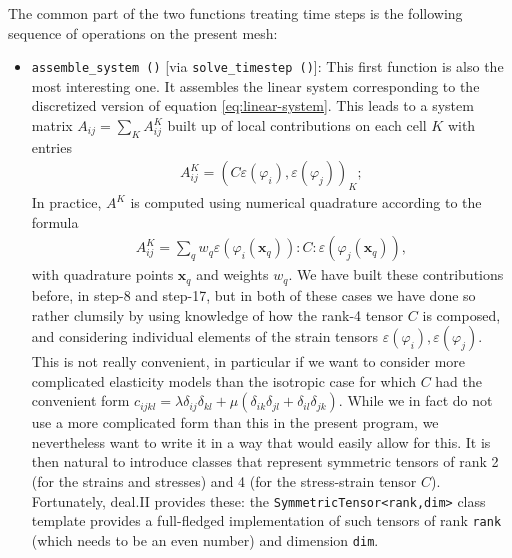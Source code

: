 \documentclass{article}
\renewcommand{\vec}[1]{\mathbf{#1}}
\begin{document}
The common part of the two functions treating time steps is the following
sequence of operations on the present mesh:
\begin{itemize}
\item \texttt{assemble\_system ()} [via \texttt{solve\_timestep ()}]:
  This first function is also the most interesting one. It assembles the
  linear system corresponding to the discretized version of equation
  \eqref{eq:linear-system}. This leads to a system matrix $A_{ij} = \sum_K
  A^K_{ij}$ built up of local contributions on each cell $K$ with entries
  \begin{gather}
    A^K_{ij} = (C \varepsilon(\varphi_i), \varepsilon(\varphi_j))_K;
  \end{gather}
  In practice, $A^K$ is computed using numerical quadrature according to the
  formula
  \begin{gather}
    A^K_{ij} = \sum_q w_q  \varepsilon(\varphi_i(\vec x_q)) : C :
                           \varepsilon(\varphi_j(\vec x_q)),
  \end{gather}
  with quadrature points $\vec x_q$ and weights $w_q$. We have built these
  contributions before, in step-8 and step-17, but in both of these cases we
  have done so rather clumsily by using knowledge of how the rank-4 tensor $C$
  is composed, and considering individual elements of the strain tensors
  $\varepsilon(\varphi_i),\varepsilon(\varphi_j)$. This is not really
  convenient, in particular if we want to consider more complicated elasticity
  models than the isotropic case for which $C$ had the convenient form
  $c_{ijkl}  = \lambda \delta_{ij} \delta_{kl} + \mu (\delta_{ik} \delta_{jl}
  + \delta_{il} \delta_{jk})$. While we in fact do not use a more complicated
  form than this in the present program, we nevertheless want to write it in a
  way that would easily allow for this. It is then natural to introduce
  classes that represent symmetric tensors of rank 2 (for the strains and
  stresses) and 4 (for the stress-strain tensor $C$). Fortunately, deal.II
  provides these: the \texttt{SymmetricTensor<rank,dim>} class template
  provides a full-fledged implementation of such tensors of rank \texttt{rank}
  (which needs to be an even number) and dimension \texttt{dim}.


\end{itemize}
\end{document}
